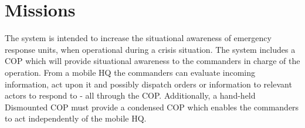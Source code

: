 \section{Missions}
The system is intended to increase the situational awareness of emergency response units, when operational during a crisis situation. The system includes a COP which will provide situational awareness to the commanders in charge of the operation. From a mobile HQ the commanders can evaluate incoming information, act upon it and possibly dispatch orders or information to relevant actors to respond to - all through the COP. Additionally, a hand-held Dismounted COP must provide a condensed COP which enables the commanders to act independently of the mobile HQ.